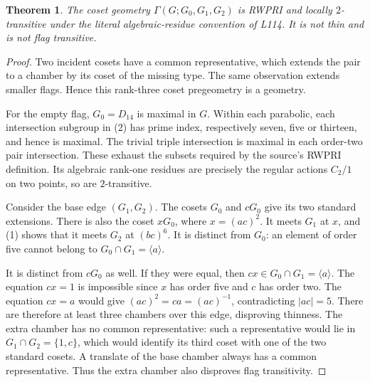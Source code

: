 \documentclass[11pt,a4paper]{article}
\newtheorem{theorem}{Theorem}
\newcommand{\gen}[1]{\langle#1\rangle}
\begin{document}
\begin{theorem}
The coset geometry $\Gamma(G;G_0,G_1,G_2)$ is RWPRI and locally
$2$-transitive under the literal algebraic-residue convention of L114.
It is not thin and is not flag transitive.
\end{theorem}
\begin{proof}
Two incident cosets have a common representative, which extends the
pair to a chamber by its coset of the missing type. The same observation
extends smaller flags. Hence this rank-three coset pregeometry is a geometry.

For the empty flag, $G_0=D_{14}$ is maximal in $G$. Within each parabolic,
each intersection subgroup in (2) has prime index, respectively seven,
five or thirteen, and hence is maximal. The trivial triple intersection
is maximal in each order-two pair intersection. These exhaust the
subsets required by the source's RWPRI definition. Its algebraic
rank-one residues are precisely the regular actions $C_2/1$ on two
points, so are $2$-transitive.

Consider the base edge $(G_1,G_2)$. The cosets $G_0$ and $cG_0$ give
its two standard extensions. There is also the coset $xG_0$, where
$x=(ac)^2$. It meets $G_1$ at $x$, and (1) shows that it meets $G_2$
at $(bc)^6$. It is distinct from $G_0$: an element of order five cannot
belong to $G_0\cap G_1=\gen a$.

It is distinct from $cG_0$ as well. If they were equal, then
$cx\in G_0\cap G_1=\gen a$. The equation $cx=1$ is impossible
since $x$ has order five and $c$ has order two. The equation $cx=a$
would give $(ac)^2=ca=(ac)^{-1}$, contradicting $|ac|=5$.
There are therefore at least three chambers over this edge, disproving
thinness. The extra chamber has no common representative: such a
representative would lie in $G_1\cap G_2=\{1,c\}$, which would identify
its third coset with one of the two standard cosets. A translate of the
base chamber always has a common representative. Thus the extra chamber
also disproves flag transitivity.
\end{proof}
\end{document}
